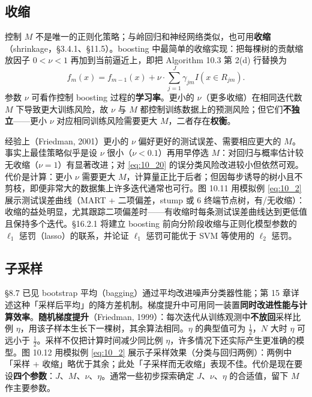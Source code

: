 \subsection{收缩}

控制 $M$ 不是唯一的正则化策略；与岭回归和神经网络类似，也可用\textbf{收缩}（shrinkage，§3.4.1、§11.5）。boosting 中最简单的收缩实现：把每棵树的贡献缩放因子 $0 < \nu < 1$ 再加到当前逼近上，即把 Algorithm 10.3 第 2(d) 行替换为
\begin{equation}\label{eq:10_41}
    f_m(x) = f_{m-1}(x) + \nu\cdot\sum_{j=1}^{J} \gamma_{jm} I(x \in R_{jm}).
\end{equation}
参数 $\nu$ 可看作控制 boosting 过程的\textbf{学习率}。更小的 $\nu$（更多收缩）在相同迭代数 $M$ 下导致更大训练风险，故 $\nu$ 与 $M$ 都控制训练数据上的预测风险；但它们\textbf{不独立}——更小 $\nu$ 对应相同训练风险需要更大 $M$，二者存在\textbf{权衡}。

经验上（Friedman, 2001）更小的 $\nu$ 偏好更好的测试误差、需要相应更大的 $M$。事实上最佳策略似乎是设 $\nu$ 很小（$\nu < 0.1$）再用早停选 $M$：对回归与概率估计较无收缩（$\nu = 1$）有显著改进；对 \eqref{eq:10_20} 的误分类风险改进较小但依然可观。代价是计算：更小 $\nu$ 需要更大 $M$，计算量正比于后者；但因每步诱导的树小且不剪枝，即便非常大的数据集上许多迭代通常也可行。图 10.11 用模拟例 \eqref{eq:10_2} 展示测试误差曲线（MART + 二项偏差，stump 或 6 终端节点树，有/无收缩）：收缩的益处明显，尤其跟踪二项偏差时——有收缩时每条测试误差曲线达到更低值且保持多个迭代。§16.2.1 将建立 boosting 前向分阶段收缩与正则化模型参数的 $\ell_1$ 惩罚（lasso）的联系，并论证 $\ell_1$ 惩罚可能优于 SVM 等使用的 $\ell_2$ 惩罚。

\subsection{子采样}

§8.7 已见 bootstrap 平均（bagging）通过平均改进噪声分类器性能；第 15 章详述这种「采样后平均」的降方差机制。梯度提升中可用同一装置\textbf{同时改进性能与计算效率}。\textbf{随机梯度提升}（Friedman, 1999）：每次迭代从训练观测中\textbf{不放回}采样比例 $\eta$，用该子样本生长下一棵树，其余算法相同。$\eta$ 的典型值可为 $\frac12$，$N$ 大时 $\eta$ 可远小于 $\frac12$。采样不仅把计算时间减少同比例 $\eta$，许多情况下还实际产生更准确的模型。图 10.12 用模拟例 \eqref{eq:10_2} 展示子采样效果（分类与回归两例）：两例中「采样 + 收缩」略优于其余；此处「子采样而无收缩」表现不佳。代价是现在要设\textbf{四个参数}：$J$、$M$、$\nu$、$\eta$。通常一些初步探索确定 $J$、$\nu$、$\eta$ 的合适值，留下 $M$ 作主要参数。

